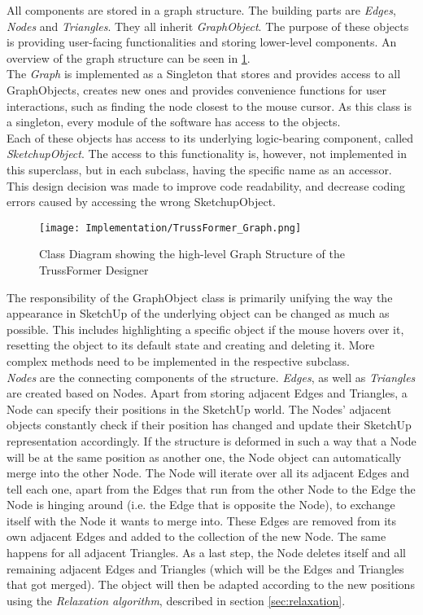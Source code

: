 All components are stored in a graph structure. The building parts are \textit{Edges}, \textit{Nodes} and \textit{Triangles}. They all inherit \textit{GraphObject}. The purpose of these objects is providing user-facing functionalities and storing lower-level components. An overview of the graph structure can be seen in \ref{fig:graph}.\\
The \textit{Graph} is implemented as a Singleton  that stores and provides access to all GraphObjects, creates new ones and provides convenience functions for user interactions, such as finding the node closest to the mouse cursor. As this class is a singleton, every module of the software has access to the objects.\\
Each of these objects has access to its underlying logic-bearing component, called \textit{SketchupObject}. The access to this functionality is, however, not implemented in this superclass, but in each subclass, having the specific name as an accessor. This design decision was made to improve code readability, and decrease coding errors caused by accessing the wrong SketchupObject.\\
\begin{figure}
    \texttt{[image: Implementation/TrussFormer\_Graph.png]}
    \centering
    \caption{Class Diagram showing the high-level Graph Structure of the TrussFormer Designer}
    \label{fig:graph}
\end{figure}
The responsibility of the GraphObject class is primarily unifying the way the appearance in SketchUp of the underlying object can be changed as much as possible. This includes highlighting a specific object if the mouse hovers over it, resetting the object to its default state and creating and deleting it. More complex methods need to be implemented in the respective subclass.\\
\textit{Nodes} are the connecting components of the structure. \textit{Edges}, as well as \textit{Triangles} are created based on Nodes. Apart from storing adjacent Edges and Triangles, a Node can specify their positions in the SketchUp world. The Nodes' adjacent objects constantly check if their position has changed and update their SketchUp representation accordingly. If the structure is deformed in such a way that a Node will be at the same position as another one, the Node object can automatically merge into the other Node. The Node will iterate over all its adjacent Edges and tell each one, apart from the Edges that run from the other Node to the Edge the Node is hinging around (i.e. the Edge that is opposite the Node), to exchange itself with the Node it wants to merge into. These Edges are removed from its own adjacent Edges and added to the collection of the new Node. The same happens for all adjacent Triangles. As a last step, the Node deletes itself and all remaining adjacent Edges and Triangles (which will be the Edges and Triangles that got merged). The object will then be adapted according to the new positions using the \textit{Relaxation algorithm}, described in section \ref{sec:relaxation}.
